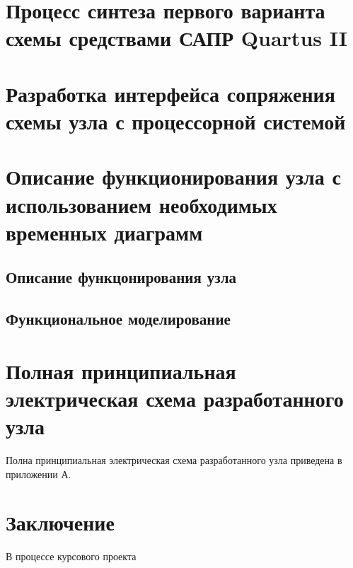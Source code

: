 \documentclass[a4paper,14pt,russian]{article}
\begin{document}
\section{Процесс синтеза первого варианта схемы средствами САПР Quartus II}


\section{Разработка интерфейса сопряжения схемы узла с процессорной системой}


\section{Описание функционирования узла с использованием необходимых временных диаграмм}
\subsection{Описание функцонирования узла}

\subsection{Функциональное моделирование}


\section{Полная принципиальная электрическая схема разработанного узла}
Полна принципиальная электрическая схема разработанного узла приведена в приложении А.

\section*{Заключение}
В процессе курсового проекта

\renewcommand\refname{Список использованных источников}
\nocite{*}


\clearpage
\appendix
\end{document}
